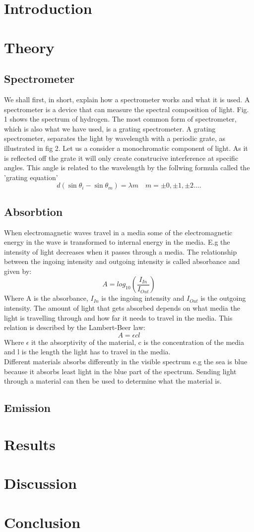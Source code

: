 \documentclass[working, oneside]{inputs/tuftebook}
\begin{document}
% 
\section*{Introduction}
\section*{Theory}
\subsection*{Spectrometer}
We shall first, in short, explain how a spectrometer works and what it is used. A spectrometer is a device that can measure the spectral composition of light. Fig. 1 shows the spectrum of hydrogen. The most common form of spectrometer, which is also what we have used, is a grating spectrometer. A grating spectrometer, separates the light by wavelength with a periodic grate, as illustrated in fig 2. Let us a consider a monochromatic component of light. As it is reflected off the grate it will only create construcive interference at specific angles. This angle is related to the wavelength by the follwing formula called the 'grating equation'
\[
d\left( \sin \theta_i - \sin \theta_m \right) = \lambda m \quad m = \pm 0, \pm 1, \pm 2 \ldots
.\] 
\subsection*{Absorbtion}
When electromagnetic waves travel in a media some of the electromagnetic energy in the wave is transformed to internal energy in the media. E.g the intensity of light decreases when it passes through a media. The relationship between the ingoing intensity and outgoing intensity is called absorbance and given by:
\[
A = log_{10}(\frac{I_{In}}{I_{Out}})
\]
Where A is the absorbance, $I_{In}$ is the ingoing intensity and $I_{Out}$ is the outgoing intensity. The amount of light that gets absorbed depends on what media the light is travelling through and how far it needs to travel in the media. This relation is described by the Lambert-Beer law:
\[
A = \epsilon c l
\]  
Where $\epsilon$ it the absorptivity of the material, c is the concentration of the media and l is the length the light has to travel in the media.
\\
Different materials absorbs differently in the visible spectrum e.g the sea is blue because it absorbs least light in the blue part of the spectrum. Sending light through a material can then be used to determine what the material is.
\subsection*{Emission}
\section*{Results}
\section*{Discussion}
\section*{Conclusion}
\end{document}
